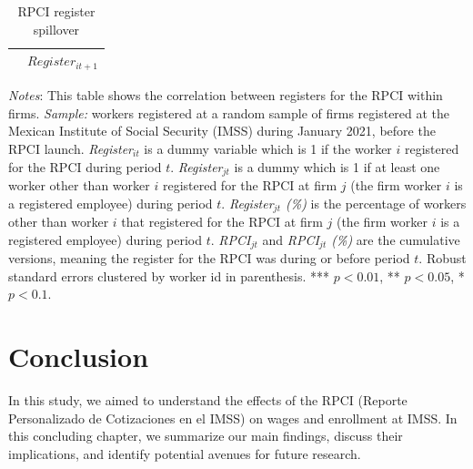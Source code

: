 \documentclass[10pt, oneside]{book}
\begin{document}
\begin{table}[H]
\footnotesize
\centering
\begin{threeparttable}
\centering
\caption{RPCI register spillover\label{tab:peer_rpci}}

\begin{tabular}[t]{lcccc}
\toprule
\toprule
& \multicolumn{4}{c}{$Register_{it+1}$} \\
\midrule


\bottomrule
\bottomrule

\end{tabular}

\begin{tablenotes}
\setlength{}
\scriptsize
\item \textit{Notes}: This table shows the correlation between registers for the RPCI within firms. \textit{Sample:} workers registered at a random sample of firms registered at the Mexican Institute of Social Security (IMSS) during January 2021, before the RPCI launch. \textit{Register$_{it}$} is a dummy variable which is 1 if the worker $i$ registered for the RPCI during period $t$. \textit{Register$_{jt}$} is a dummy which is 1 if at least one worker other than worker $i$ registered for the RPCI at firm $j$ (the firm worker $i$ is a registered employee) during period $t$. \textit{Register$_{jt}$ (\%)} is the percentage of workers other than worker $i$ that registered for the RPCI at firm $j$ (the firm worker $i$ is a registered employee) during period $t$. \textit{RPCI$_{jt}$} and \textit{RPCI$_{jt}$ (\%)} are the cumulative versions, meaning the register for the RPCI was during or before period $t$. Robust standard errors clustered by worker id in parenthesis. *** $p<0.01$, ** $p<0.05$, * $p<0.1$. %
\end{tablenotes}
\end{threeparttable}
\end{table}

\chapter{Conclusion} \label{conclusion}

In this study, we aimed to understand the effects of the RPCI (Reporte Personalizado de Cotizaciones en el IMSS) on wages and enrollment at IMSS. In this concluding chapter, we summarize our main findings, discuss their implications, and identify potential avenues for future research. \\
\end{document}
